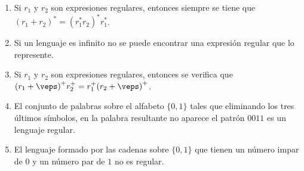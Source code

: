 \begin{enumerate}
    \item Si $r_1$ y $r_2$ son expresiones regulares, entonces siempre se tiene que ${(r_1+r_2)}^{\ast}={(r_1^\ast r_2)}^{\ast}r_1^\ast$.
    \item Si un lenguaje es infinito no se puede encontrar una expresión regular que lo represente.
    \item Si $r_1$ y $r_2$ son expresiones regulares, entonces se verifica que ${(r_1+\veps)}^{+}r_2^+ = r_1^+ {(r_2+\veps)}^{+}$.
    \item El conjunto de palabras sobre el alfabeto $\{0,1\}$ tales que eliminando los tres últimos símbolos, en la palabra resultante no aparece el patrón $0011$ es un lenguaje regular.
    \item El lenguaje formado por las cadenas sobre $\{0,1\}$ que tienen un número impar de $0$ y un número par de $1$ no es regular.
\end{enumerate}
